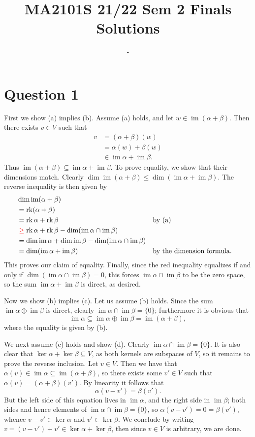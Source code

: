 \documentclass[12pt]{article}
\title{MA2101S 21/22 Sem 2 Finals Solutions}
\author{-}
\DeclareMathOperator{\im}{im}
\DeclareMathOperator{\rk}{rk}
\begin{document}
\maketitle

\section*{Question 1}
First we show (a) implies (b). Assume (a) holds, and let $w\in\im(\alpha+\beta)$.
Then there exists $v\in V$ such that
\begin{align*}
    v &= (\alpha+\beta)(w) \\&= \alpha(w) + \beta(w)\\&\in \im\alpha+\im\beta.
\end{align*}
Thus $\im(\alpha+\beta)\subseteq\im\alpha+\im\beta$. To prove equality, we
show that their dimensions match. Clearly
$\dim\im(\alpha+\beta)\leq\dim(\im\alpha+\im\beta)$. The reverse inequality is
then given by
\begin{alignat*}{2}
    &\dim\im(\alpha+\beta)
    \\&=\rk(\alpha+\beta)
    \\&=\rk\alpha+\rk\beta &&\text{by (a)}
    \\&\color{red}\geq\color{black}\rk\alpha+\rk\beta-\dim(\im\alpha\cap\im\beta)
    \\&=\dim\im\alpha+\dim\im\beta-\dim(\im\alpha\cap\im\beta)
    \\&=\dim(\im\alpha+\im\beta)
      &&\text{by the dimension formula.}
\end{alignat*}
This proves our claim of equality. Finally, since the red inequality equalizes
if and only if $\dim(\im\alpha\cap\im\beta)=0$, this forces
$\im\alpha\cap\im\beta$ to be the zero space, so the sum $\im\alpha+\im\beta$
is direct, as desired.

Now we show (b) implies (c). Let us assume (b) holds.
Since the sum $\im\alpha\oplus\im\beta$ is
direct, clearly $\im\alpha\cap\im\beta=\{0\}$; furthermore it is obvious that
\[
    \im\alpha\subseteq\im\alpha\oplus\im\beta=\im(\alpha+\beta),
\]
where the equality is given by (b).

We next assume (c) holds and show (d). Clearly $\im\alpha\cap\im\beta=\{0\}$.
It is also clear that $\ker\alpha+\ker\beta\subseteq V$, as both kernels are
subspaces of $V$, so it remains to prove the reverse inclusion. Let $v\in V$.
Then we have that
$\alpha(v)\in\im\alpha\subseteq\im(\alpha+\beta)$, so there exists some
$v'\in V$ such that $\alpha(v)=(\alpha+\beta)(v')$. By linearity it follows that
\[
    \alpha(v-v')=\beta(v').
\]
But the left side of this equation lives in $\im\alpha$, and the right side in
$\im\beta$; both sides and hence elements of $\im\alpha\cap\im\beta=\{0\}$, so
$\alpha(v-v')=0=\beta(v')$, whence $v-v'\in\ker\alpha$ and $v'\in\ker\beta$.
We conclude by writing $v=(v-v')+v'\in\ker\alpha+\ker\beta$, then since $v\in V$
is arbitrary, we are done.
\end{document}
